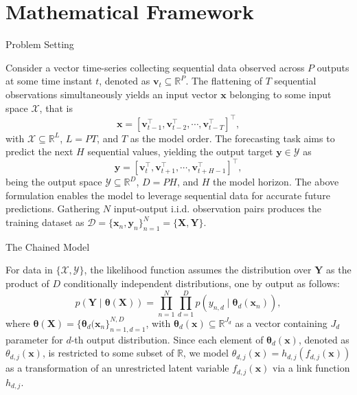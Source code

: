 \section{Mathematical Framework}

\begin{frame}{Problem Setting}

Consider a vector time-series collecting sequential data observed across $P$ outputs at some time instant \( t \), denoted as \( \boldsymbol{v}_t \subseteq \mathbb{R}^{P}\). The flattening of \( T \) sequential observations simultaneously yields an input vector \( \boldsymbol{x} \) belonging to some input space \( \mathcal{X} \), that is
\[
\boldsymbol{x}= [ \boldsymbol{v}_{t-1}^\top, \boldsymbol{v}_{t-2}^\top, \cdots, \boldsymbol{v}_{t-T}^\top  ]^\top,
\]
with \( {\mathcal{X}} \subseteq \mathbb{R}^{L} \), \( L = PT \), and \( T \) as the model order. The forecasting task aims to predict the next \(H\) sequential values, yielding the output target \( \boldsymbol{y} \in {\mathcal{Y}} \) as
\[
\boldsymbol{y} = [ \boldsymbol{v}_{t}^\top, \boldsymbol{v}_{t+1}^\top, \cdots, \boldsymbol{v}_{t+H-1}^\top  ]^\top,
\] 
being the output space \( {\mathcal{Y}} \subseteq \mathbb{R}^{D} \), \( D = PH \), and \( H \) the model horizon. The above formulation enables the model to leverage sequential data for accurate future predictions. Gathering \( N \) input-output i.i.d. observation pairs produces the training dataset as \( {\mathcal{D}} = \{\boldsymbol{x}_n, \boldsymbol{y}_n\}_{n=1}^N = \{ \boldsymbol{X}, \boldsymbol{Y}\} \).

\end{frame}

\begin{frame}{The Chained Model}

For data in $\{\mathcal{X},\mathcal{Y}\}$, the likelihood function assumes the distribution over \(  \boldsymbol{Y} \) as the product of \( D \) conditionally independent distributions, one by output as follows:
\begin{equation}\label{eq:likelihood_funciton}
	p(\boldsymbol{Y} \mid \boldsymbol{\theta}(\boldsymbol{X})) = \prod_{n=1}^N \prod_{d=1}^D p\left(y_{n,d} \mid \boldsymbol{\theta}_d(\boldsymbol{x}_n)\right),
\end{equation}
where \( \boldsymbol{\theta}(\boldsymbol{X}) = \{ \boldsymbol{\theta}_d(\boldsymbol{x}_n \}_{n=1,d=1}^{N, D} \), with \( \boldsymbol{\theta}_d(\boldsymbol{x}) \subseteq \mathbb{R}^{J_d} \) as a vector containing \( J_d \) parameter for \( d \)-th output distribution. Since each element of \( \boldsymbol{\theta}_d(\boldsymbol{x}) \), denoted as \( \theta_{d,j}(\boldsymbol{x}) \), is restricted to some subset of \( \mathbb{R} \), we model \( \theta_{d,j}(\boldsymbol{x}) = h_{d,j}(f_{d,j}(\boldsymbol{x})) \) as a transformation of an unrestricted latent variable \( f_{d,j}(\boldsymbol{x}) \) via a link function \( h_{d,j} \).

\end{frame}

